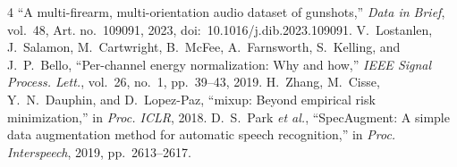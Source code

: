 \documentclass[conference]{IEEEtran}
\begin{document}
\begin{thebibliography}{4}
 ``A multi-firearm, multi-orientation audio dataset of gunshots,'' \emph{Data in Brief}, vol.~48, Art. no.~109091, 2023, doi:~10.1016/j.dib.2023.109091.
 V.~Lostanlen, J.~Salamon, M.~Cartwright, B.~McFee, A.~Farnsworth, S.~Kelling, and J.~P.~Bello, ``Per-channel energy normalization: Why and how,'' \emph{IEEE Signal Process. Lett.}, vol.~26, no.~1, pp.~39--43, 2019.
 H.~Zhang, M.~Cisse, Y.~N.~Dauphin, and D.~Lopez-Paz, ``mixup: Beyond empirical risk minimization,'' in \emph{Proc. ICLR}, 2018.
 D.~S.~Park \emph{et al.}, ``SpecAugment: A simple data augmentation method for automatic speech recognition,'' in \emph{Proc. Interspeech}, 2019, pp.~2613--2617.
\end{thebibliography}
\end{document}

